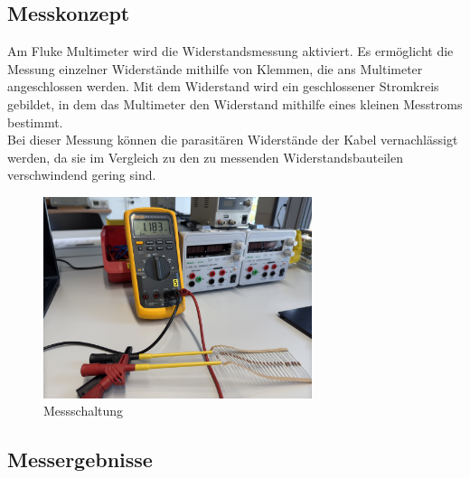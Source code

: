 \documentclass[a4paper,12pt]{article}
\begin{document}
\subsection{Messkonzept}
Am Fluke Multimeter wird die Widerstandsmessung aktiviert. Es ermöglicht die Messung einzelner Widerstände mithilfe von Klemmen, die ans Multimeter angeschlossen werden. Mit dem Widerstand wird ein geschlossener Stromkreis gebildet, in dem das Multimeter den Widerstand mithilfe eines kleinen Messtroms bestimmt.\\
\noindent Bei dieser Messung können die parasitären Widerstände der Kabel vernachlässigt werden, da sie im Vergleich zu den zu messenden Widerstandsbauteilen verschwindend gering sind.

\begin{figure}[H]
    \centering
    \includegraphics[width=0.7\textwidth]{../Quellen/Labor2/Fotos/IMG_4011.jpeg}
\caption{Messschaltung}
\end{figure}

\subsection{Messergebnisse}
\begin{table}[H]
	\centering
{}
	\caption{Einzelne Messungen}
\end{table}
\end{document}
